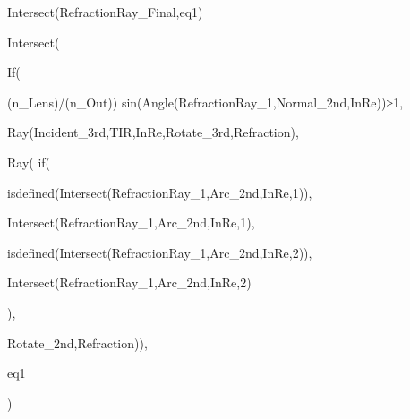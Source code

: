 Intersect(RefractionRay_{Final},eq1)

Intersect(

  If(
    
  (n_{Lens})/(n_{Out})) sin(Angle(RefractionRay_{1},Normal_{2nd,InRe}))≥1,
  
  Ray(Incident_{3rd,TIR,InRe},Rotate_{3rd,Refraction}),
  
  Ray(  if(
    

    isdefined(Intersect(RefractionRay_{1},Arc_{2nd,InRe},1)),

    Intersect(RefractionRay_{1},Arc_{2nd,InRe},1),

    isdefined(Intersect(RefractionRay_{1},Arc_{2nd,InRe},2)),

    Intersect(RefractionRay_{1},Arc_{2nd,InRe},2)

  ),
  
  Rotate_{2nd,Refraction})),
  
  eq1
  
)